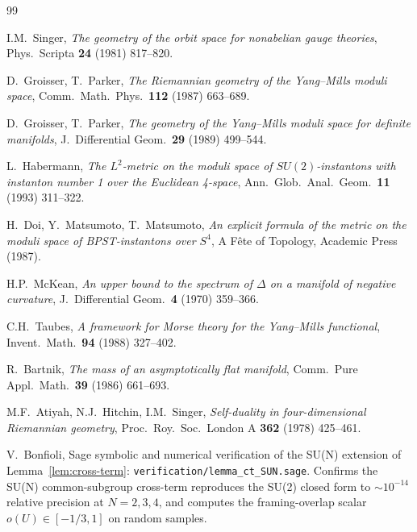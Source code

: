 \documentclass[11pt,letterpaper]{article}
\theoremstyle{definition}
\begin{document}
\begin{thebibliography}{99}

 I.M.\ Singer, \emph{The geometry of the orbit space for nonabelian gauge theories}, Phys.\ Scripta \textbf{24} (1981) 817--820.

 D.\ Groisser, T.\ Parker, \emph{The Riemannian geometry of the Yang--Mills moduli space}, Comm.\ Math.\ Phys.\ \textbf{112} (1987) 663--689.

 D.\ Groisser, T.\ Parker, \emph{The geometry of the Yang--Mills moduli space for definite manifolds}, J.\ Differential Geom.\ \textbf{29} (1989) 499--544.

 L.\ Habermann, \emph{The $L^2$-metric on the moduli space of $SU(2)$-instantons with instanton number 1 over the Euclidean 4-space}, Ann.\ Glob.\ Anal.\ Geom.\ \textbf{11} (1993) 311--322.

 H.\ Doi, Y.\ Matsumoto, T.\ Matsumoto, \emph{An explicit formula of the metric on the moduli space of BPST-instantons over $S^4$}, A F\^ete of Topology, Academic Press (1987).

 H.P.\ McKean, \emph{An upper bound to the spectrum of $\Delta$ on a manifold of negative curvature}, J.\ Differential Geom.\ \textbf{4} (1970) 359--366.

 C.H.\ Taubes, \emph{A framework for Morse theory for the Yang--Mills functional}, Invent.\ Math.\ \textbf{94} (1988) 327--402.

 R.\ Bartnik, \emph{The mass of an asymptotically flat manifold}, Comm.\ Pure Appl.\ Math.\ \textbf{39} (1986) 661--693.

 M.F.\ Atiyah, N.J.\ Hitchin, I.M.\ Singer, \emph{Self-duality in four-dimensional Riemannian geometry}, Proc.\ Roy.\ Soc.\ London A \textbf{362} (1978) 425--461.


 V.\ Bonfioli, Sage symbolic and numerical verification of the SU(N) extension of Lemma~\ref{lem:cross-term}: \texttt{verification/lemma\_ct\_SUN.sage}. Confirms the SU(N) common-subgroup cross-term reproduces the SU(2) closed form to $\sim 10^{-14}$ relative precision at $N=2,3,4$, and computes the framing-overlap scalar $o(U) \in [-1/3, 1]$ on random samples.



\end{thebibliography}
\end{document}
